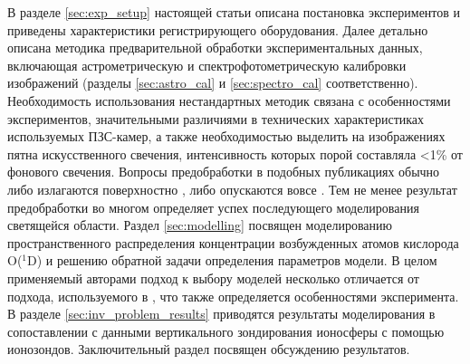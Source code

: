 \documentclass[12pt,a4paper]{article}
\begin{document}
В разделе \ref{sec:exp_setup} настоящей статьи описана постановка экспериментов и приведены характеристики регистрирующего оборудования. Далее детально описана методика предварительной обработки экспериментальных данных, включающая астрометрическую и спектрофотометрическую калибровки изображений (разделы \ref{sec:astro_cal} и \ref{sec:spectro_cal} соответственно). Необходимость использования нестандартных методик связана с особенностями экспериментов, значительными различиями в технических характеристиках используемых ПЗС-камер, а также необходимостью выделить на изображениях пятна искусственного свечения, интенсивность которых порой составляла <1\% от фонового свечения. Вопросы предобработки в подобных публикациях обычно либо излагаются поверхностно \cite{Gustavsson2008}, либо опускаются вовсе \cite{Pedersen2011}. Тем не менее результат предобработки во многом определяет успех последующего моделирования светящейся области. Раздел \ref{sec:modelling} посвящен моделированию пространственного распределения концентрации возбужденных атомов кислорода O($^1$D) и решению обратной задачи определения параметров модели. В целом применяемый авторами подход к выбору моделей несколько отличается от подхода, используемого в \cite{Gustavsson2001, Gustavsson2008}, что также определяется особенностями эксперимента. В разделе \ref{sec:inv_problem_results} приводятся результаты моделирования в сопоставлении с данными вертикального зондирования ионосферы с помощью ионозондов. Заключительный раздел посвящен обсуждению результатов.

\end{document}
